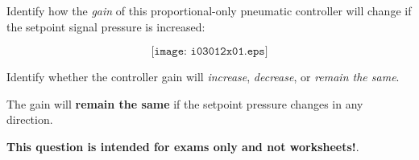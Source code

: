 

Identify how the {\it gain} of this proportional-only pneumatic controller will change if the setpoint signal pressure is increased:

$$\texttt{[image: i03012x01.eps]}$$

Identify whether the controller gain will {\it increase}, {\it decrease}, or {\it remain the same}.

\vskip 30pt







The gain will {\bf remain the same} if the setpoint pressure changes in any direction.







{\bf This question is intended for exams only and not worksheets!}.



